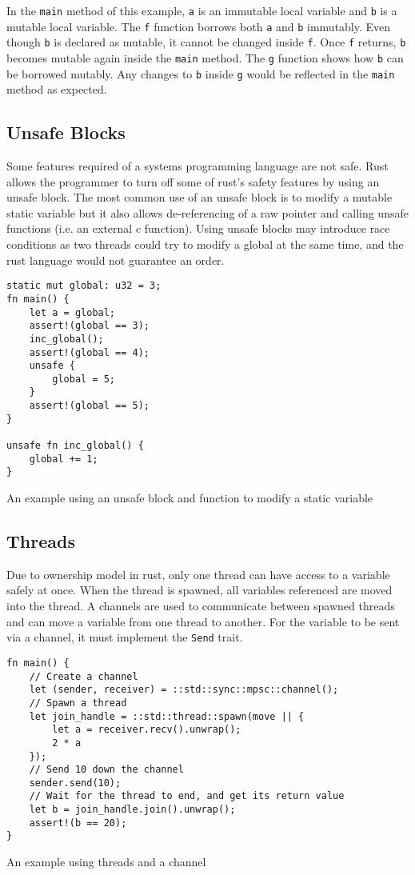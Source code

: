 In the \texttt{main} method of this example, \texttt{a} is an immutable local variable and \texttt{b} is a mutable local variable. The \texttt{f} function borrows both \texttt{a} and \texttt{b} immutably. Even though \texttt{b} is declared as mutable, it cannot be changed inside \texttt{f}. Once \texttt{f} returns, \texttt{b} becomes mutable again inside the \texttt{main} method. The \texttt{g} function shows how \texttt{b} can be borrowed mutably. Any changes to \texttt{b} inside \texttt{g} would be reflected in the \texttt{main} method as expected.

\subsection{Unsafe Blocks}
Some features required of a systems programming language are not safe. Rust allows the programmer to turn off some of rust's safety features by using an unsafe block. The most common use of an unsafe block is to modify a mutable static variable but it also allows de-referencing of a raw pointer and calling unsafe functions (i.e. an external c function). Using unsafe blocks may introduce race conditions as two threads could try to modify a global at the same time, and the rust language would not guarantee an order.

\begin{code}
\begin{verbatim}
static mut global: u32 = 3;
fn main() {
    let a = global;
    assert!(global == 3);
    inc_global();
    assert!(global == 4);
    unsafe {
        global = 5;
    }
    assert!(global == 5);
}

unsafe fn inc_global() {
    global += 1;
}
\end{verbatim}
\caption{An example using an unsafe block and function to modify a static variable}
\end{code}

\subsection{Threads}
Due to ownership model in rust, only one thread can have access to a variable safely at once. When the thread is spawned, all variables referenced are moved into the thread. A channels are used to communicate between spawned threads and can move a variable from one thread to another. For the variable to be sent via a channel, it must implement the \texttt{Send} trait.

\begin{code}
\begin{verbatim}
fn main() {
    // Create a channel
    let (sender, receiver) = ::std::sync::mpsc::channel();
    // Spawn a thread
    let join_handle = ::std::thread::spawn(move || {
        let a = receiver.recv().unwrap();
        2 * a
    });
    // Send 10 down the channel
    sender.send(10);
    // Wait for the thread to end, and get its return value
    let b = join_handle.join().unwrap();
    assert!(b == 20);
}
\end{verbatim}
\caption{An example using threads and a channel}
\end{code}

